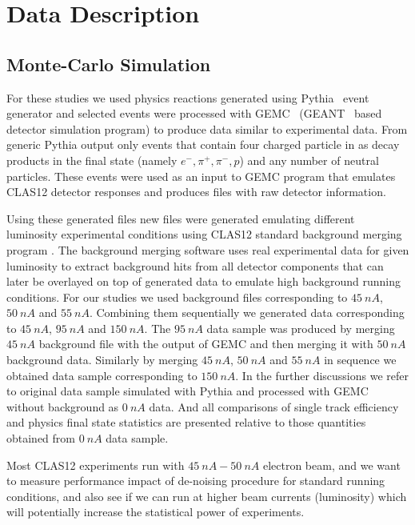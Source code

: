 \section{Data Description}

\subsection{Monte-Carlo Simulation}

For these studies we used physics reactions generated using Pythia~\cite{Pythia:2022} event generator and selected events were processed with GEMC~\cite{gemc:2022} (GEANT~\cite{geant4:2022} based detector simulation program) to produce data similar to experimental data. From generic Pythia output only events that contain four charged particle in as decay products in the final state (namely $e^-,\pi^+,\pi^-,p$) and any number of neutral particles. These events were used as an input to GEMC program that emulates CLAS12 detector responses and produces files with raw detector information.

Using these generated files new files were generated emulating different luminosity experimental conditions using CLAS12 standard background merging program \cite{Stepanyan:2020bg}. The background merging software uses real experimental data for given luminosity to extract background hits from all detector components that can later be overlayed on top of generated data to emulate high background running conditions. For our studies we used background files corresponding to $45~nA$, $50~nA$ and $55~nA$. Combining them sequentially we generated data corresponding to $45~nA$, $95~nA$ and $150~nA$. The $95~nA$ data sample was produced by merging $45~nA$ background file with the output of GEMC and then merging it with $50~nA$ background data. Similarly by merging $45~nA$, $50~nA$ and $55~nA$ in sequence we obtained data sample corresponding to $150~nA$. In the further discussions we refer to original data sample simulated with Pythia and processed with GEMC without background as $0~nA$ data. And all comparisons of single track efficiency and physics final state statistics 
are presented relative to those quantities obtained from $0~nA$ data sample.

Most CLAS12 experiments run with $45~nA-50~nA$ electron beam, and we want to measure performance impact of de-noising procedure for standard running conditions, and also see if we can run at higher beam currents (luminosity) which will potentially increase the statistical power of experiments.

